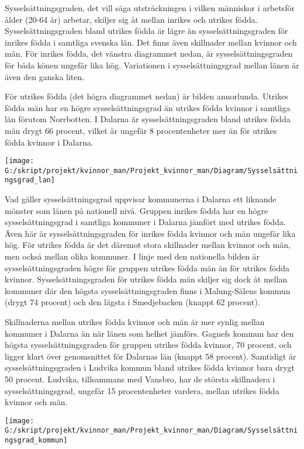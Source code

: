 \documentclass[
]{article}
\begin{document}
Sysselsättningsgraden, det vill säga utsträckningen i vilken människor i
arbetsför ålder (20-64 år) arbetar, skiljer sig åt mellan inrikes och
utrikes födda. Sysselsättningsgraden bland utrikes födda är lägre än
sysselsättningsgraden för inrikes födda i samtliga svenska län. Det
finns även skillnader mellan kvinnor och män. För inrikes födda, det
vänstra diagrammet nedan, är sysselsättningsgraden för båda könen
ungefär lika hög. Variationen i sysselsättningsgrad mellan länen är även
den ganska liten.

För utrikes födda (det högra diagrammet nedan) är bilden annorlunda.
Utrikes födda män har en högre sysselsättningsgrad än utrikes födda
kvinnor i samtliga län förutom Norrbotten. I Dalarna är
sysselsättningsgraden bland utrikes födda män drygt 66 procent, vilket
är ungefär 8 procentenheter mer än för utrikes födda kvinnor i Dalarna.

\begin{center}\texttt{[image: G:/skript/projekt/kvinnor\_man/Projekt\_kvinnor\_man/Diagram/Sysselsättningsgrad\_lan]} \end{center}

Vad gäller sysselsättningsgrad uppvisar kommunerna i Dalarna ett
liknande mönster som länen på nationell nivå. Gruppen inrikes födda har
en högre sysselsättningsgrad i samtliga kommuner i Dalarna jämfört med
utrikes födda. Även här är sysselsättningsgraden för inrikes födda
kvinnor och män ungefär lika hög. För utrikes födda är det däremot stora
skillnader mellan kvinnor och män, men också mellan olika kommuner. I
linje med den nationella bilden är sysselsättningsgraden högre för
gruppen utrikes födda män än för utrikes födda kvinnor.
Sysselsättningsgraden för utrikes födda män skiljer sig dock åt mellan
kommuner där den högsta sysselsättningsgraden finns i Malung-Sälens
kommun (drygt 74 procent) och den lägsta i Smedjebacken (knappt 62
procent).

Skillnaderna mellan utrikes födda kvinnor och män är mer synlig mellan
kommuner i Dalarna än när länen som helhet jämförs. Gagnefs kommun har
den högsta sysselsättningsgraden för gruppen utrikes födda kvinnor, 70
procent, och ligger klart över genomsnittet för Dalarnas län (knappt 58
procent). Samtidigt är sysselsättningsgraden i Ludvika kommun bland
utrikes födda kvinnor bara drygt 50 procent. Ludvika, tillsammans med
Vansbro, har de största skillnadera i sysselsättningsgrad, ungefär 15
procentenheter vardera, mellan utrikes födda kvinnor och män.

\begin{center}\texttt{[image: G:/skript/projekt/kvinnor\_man/Projekt\_kvinnor\_man/Diagram/Sysselsättningsgrad\_kommun]} \end{center}
\end{document}
